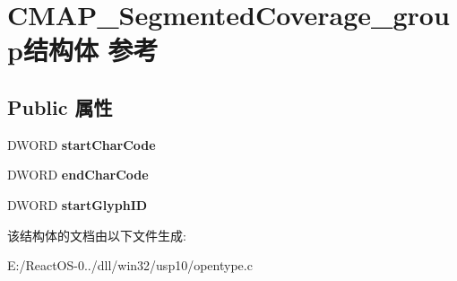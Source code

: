\hypertarget{struct_c_m_a_p___segmented_coverage__group}{}\section{C\+M\+A\+P\+\_\+\+Segmented\+Coverage\+\_\+group结构体 参考}
\label{struct_c_m_a_p___segmented_coverage__group}
\subsection*{Public 属性}
\begin{DoxyCompactItemize}
\item 
\mbox{\label{struct_c_m_a_p___segmented_coverage__group_a39a098f4047914d56f849dcc7b3474d2}} 
D\+W\+O\+RD {\bfseries start\+Char\+Code}
\item 
\mbox{\label{struct_c_m_a_p___segmented_coverage__group_a6bf9cbb514944fa64b1544e4bd7b5ce2}} 
D\+W\+O\+RD {\bfseries end\+Char\+Code}
\item 
\mbox{\label{struct_c_m_a_p___segmented_coverage__group_af64f9c415c9e754eaa0e7382033dc551}} 
D\+W\+O\+RD {\bfseries start\+Glyph\+ID}
\end{DoxyCompactItemize}


该结构体的文档由以下文件生成\+:\begin{DoxyCompactItemize}
\item 
E\+:/\+React\+O\+S-\/0../dll/win32/usp10/opentype.\+c\end{DoxyCompactItemize}
